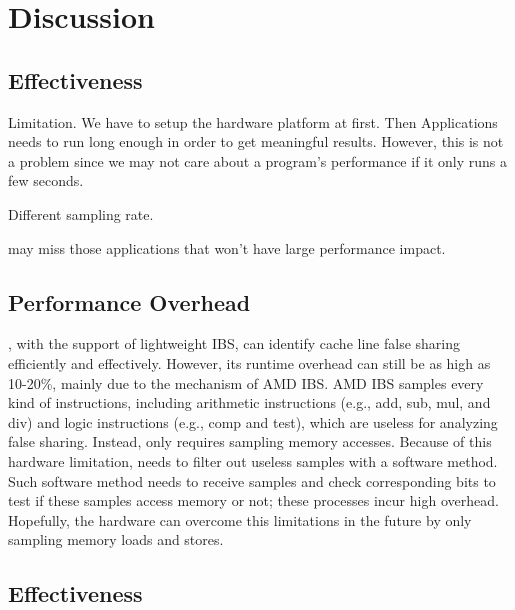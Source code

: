 \section{Discussion}

\label{sec:discuss}
\subsection{Effectiveness}

Limitation. 
We have to setup the hardware platform at first. 
Then Applications needs to run long enough in order to get meaningful results. 
However, this is not a problem since we may not care about a program's performance if it only runs a few seconds. 

Different sampling rate. 

\Cheetah{} may miss those applications that won't have large performance impact. 

\subsection{Performance Overhead}

\Cheetah{}, with the support of lightweight IBS, can identify cache line false sharing efficiently and effectively. However, its runtime overhead can still be as high as 10-20\%, mainly due to the mechanism of AMD IBS. AMD IBS samples every kind of instructions, including arithmetic instructions (e.g., add, sub, mul, and div) and logic instructions (e.g., comp and test), which are useless for analyzing false sharing. Instead, \cheetah{} only requires sampling memory accesses. Because of this hardware limitation, \cheetah{} needs to filter out useless samples with a software method. Such software method needs \cheetah{} to receive samples and check corresponding bits to test if these samples access memory or not; these processes incur high overhead. Hopefully, the hardware can overcome this limitations in the future by only sampling memory loads and stores.

\subsection{Effectiveness}
